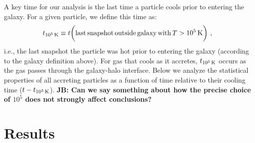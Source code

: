 \documentclass[fleqn,usenatbib]{mnras}
\newcommand{\tcon}{t_{10^5\,{\rm K}}}
\begin{document}
A key time for our analysis is the last time a particle cools prior to entering the galaxy.
For a given particle, we define this time as:
\begin{equation}
    \tcon \equiv t \bigg( {\rm last\,snapshot\,outside\,galaxy\,with\,}T>10^5\,{\rm K} \bigg) ~,
\label{e: tcon}
\end{equation}
i.e., the last snapshot the particle was hot prior to entering the galaxy (according to the galaxy definition above).
For gas that cools as it accretes, $\tcon$ occurs as the gas passes through the galaxy-halo interface.
Below we analyze the statistical properties of all accreting particles as a function of time relative to their cooling time ($t-\tcon$).
{\bf JB: Can we say something about how the precise choice of $10^5$ does not strongly affect conclusions?}

\section{Results}
\label{s: results}

\end{document}
